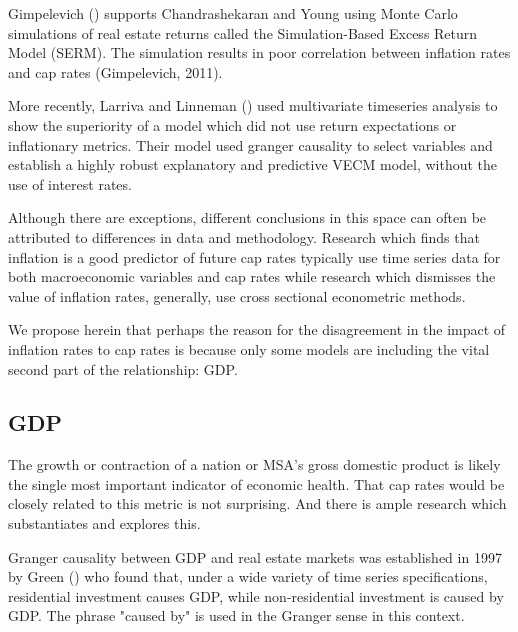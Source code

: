 \documentclass[jrfm,article,submit,oneauthor,pdftex]{Definitions/mdpi}
\begin{document}
Gimpelevich (\citeyear{Gimpelevich2011}) supports Chandrashekaran and Young using Monte Carlo simulations of real estate returns called the Simulation-Based Excess Return Model (SERM). The simulation results in poor correlation between inflation rates and cap rates (Gimpelevich, 2011).

More recently, Larriva and Linneman (\citeyear{larriva2021determinants}) used multivariate timeseries analysis to show the superiority of a model which did not use return expectations or inflationary metrics. Their model used granger causality to select variables and establish a highly robust explanatory and predictive VECM model, without the use of interest rates.

Although there are exceptions, different conclusions in this space can often be attributed to differences in data and methodology. Research which finds that inflation is a good predictor of future cap rates typically use time series data for both macroeconomic variables and cap rates while research which dismisses the value of inflation rates, generally, use cross sectional econometric methods.

We propose herein that perhaps the reason for the disagreement in the impact of inflation rates to cap rates is because only some models are including the vital second part of the relationship: GDP.


\subsection{GDP}

The growth or contraction of a nation or MSA's gross domestic product is likely the single most important indicator of economic health. That cap rates would be closely related to this metric is not surprising. And there is ample research which substantiates and explores this.

Granger causality between GDP and real estate markets was established in 1997 by Green (\citeyear{green1997follow}) who found that, under a wide variety of time series specifications, residential investment causes GDP, while non-residential investment is caused by GDP. The phrase "caused by" is used in the Granger sense in this context. 
\end{document}
